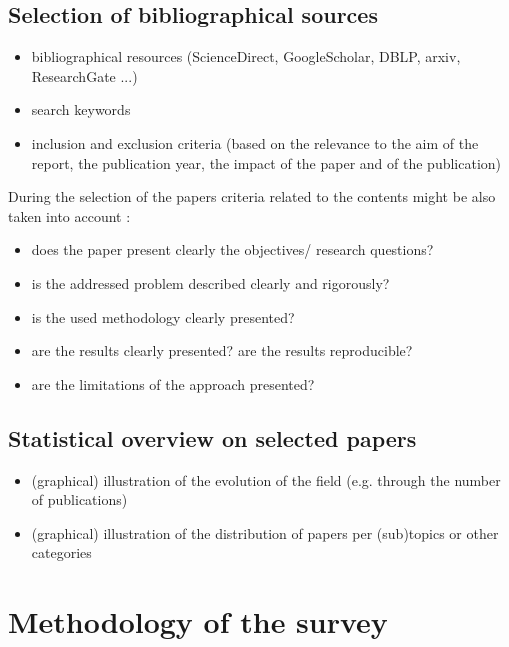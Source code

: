 \documentclass{article}
\begin{document}
\subsection{Selection of bibliographical sources}

\begin{itemize}
\item bibliographical resources (ScienceDirect, GoogleScholar, DBLP, arxiv, ResearchGate ...)

\item search keywords

\item inclusion and exclusion criteria (based on the relevance to the aim of the report, the publication year, the impact of the paper and of the publication) 
\end{itemize}

During the selection of the papers criteria related to the contents might be also taken into account \cite{Rivera2022}:

\begin{itemize}
\item does the paper present clearly the objectives/ research questions?
\item is the addressed problem described clearly and rigorously?
\item is the used methodology clearly presented?
\item are the results clearly presented? are the results reproducible?
\item are the limitations of the approach presented? 
\end{itemize}

\subsection{Statistical overview on selected papers}

\begin{itemize}
\item (graphical) illustration of the evolution of the field (e.g. through the number of publications)

\item (graphical) illustration of the distribution of papers per (sub)topics or other categories
\end{itemize}

\section{Methodology of the survey}
\end{document}

